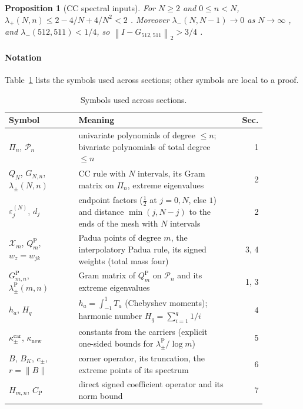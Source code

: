 \documentclass[preprint,12pt,a4paper]{elsarticle}
\newtheorem{proposition}[theorem]{Proposition}
\theoremstyle{remark}
\newcommand{\norm}[1]{\left\lVert#1\right\rVert}
\begin{document}
\begin{proposition}[CC spectral inputs]\label{prop:cc-inputs}
For $N\ge2$ and $0\le n<N$, $\lambda_+(N,n)\le2-4/N+4/N^2<2$
\citep[Cor.~3.2]{MZ-CC}.
Moreover $\lambda_-(N,N-1)\to0$ as $N\to\infty$ \citep[Thm~4.3]{MZ-CC}, and
$\lambda_-(512,511)<1/4$, so $\norm{I-G_{512,511}}_2>3/4$ \citep[Prop.~8.1]{MZ-CC}.
\end{proposition}

\paragraph{Notation}
Table~\ref{tab:notation} lists the symbols used across sections; other symbols
are local to a proof.
\begin{table}[tb]
\centering\small
\caption{Symbols used across sections.}\label{tab:notation}
\begin{tabular}{@{}p{0.27\linewidth}p{0.6\linewidth}r@{}}\toprule
Symbol & Meaning & Sec.\\\midrule
$\Pi_n$, $\mathcal P_n$ & univariate polynomials of degree $\le n$; bivariate polynomials of total degree $\le n$ & 1\\
$Q_N$, $G_{N,n}$, $\lambda_\pm(N,n)$ & CC rule with $N$ intervals, its Gram matrix on $\Pi_n$, extreme eigenvalues & 2\\
$\varepsilon^{(N)}_j$, $d_j$ & endpoint factors ($\frac12$ at $j=0,N$, else $1$) and distance $\min(j,N-j)$ to the ends of the mesh with $N$ intervals & 2\\
$\mathcal X_m$, $Q^{\mathrm P}_m$, $w_z=w_{jk}$ & Padua points of degree $m$, the interpolatory Padua rule, its signed weights (total mass four) & 3, 4\\
$G^{\mathrm P}_{m,n}$, $\lambda^{\mathrm P}_\pm(m,n)$ & Gram matrix of $Q^{\mathrm P}_m$ on $\mathcal P_n$ and its extreme eigenvalues & 1, 3\\
$h_a$, $H_q$ & $h_a=\int_{-1}^1T_a$ (Chebyshev moments); harmonic number $H_q=\sum_{i=1}^q1/i$ & 4\\
$\kappa^{\mathrm{car}}_\pm$, $\kappa_{\mathrm{new}}$ & constants from the carriers (explicit one-sided bounds for $\lambda^{\mathrm P}_\pm/\log m$) & 5\\
$B$, $B_K$, $c_\pm$, $r=\|B\|$ & corner operator, its truncation, the extreme points of its spectrum & 6\\
$H_{m,n}$, $C_{\mathrm P}$ & direct signed coefficient operator and its norm bound & 7\\\bottomrule
\end{tabular}
\end{table}
\end{document}
